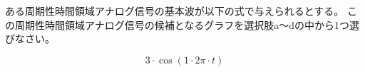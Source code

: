 ある周期性時間領域アナログ信号の基本波が以下の式で与えられるとする。
この周期性時間領域アナログ信号の候補となるグラフを選択肢a〜dの中から1つ選びなさい。

\[
3 \cdot \cos( 1 \cdot 2\pi \cdot t )
\]
